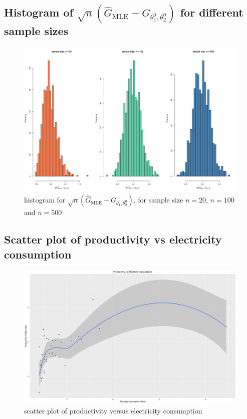 \subsection{Histogram of $\sqrt{n}(\hat{G}_{\text{MLE}} - G_{\theta_1^0, \theta_2^0})$ for different sample sizes}

\begin{figure}[H]
  \centering
  \includegraphics[width=\textwidth]{figures/png/special_formula_comparison.png}
  \caption{histogram for $\sqrt{n}(\hat{G}_{\text{MLE}} - G_{\theta_1^0, \theta_2^0})$, for sample size $n = 20$, $n = 100$ and $n = 500$}
  \label{fig:special-formula-sample-size-comparison}
\end{figure}

\subsection{Scatter plot of productivity vs electricity consumption}

\begin{figure}[H]
  \centering
  \includegraphics[width=\textwidth]{figures/png/lm_scatter_plot.png}
  \caption{scatter plot of productivity versus electricity consumption}
  \label{fig:scatter_plot}
\end{figure}


